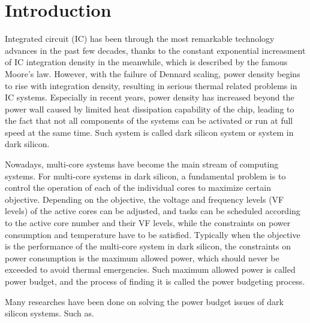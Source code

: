 \section{Introduction}

Integrated circuit (IC) has been through the most remarkable technology advances in the past few decades, thanks to the constant exponential increasment of IC integration density in the meanwhile, which is described by the famous Moore's law. However, with the failure of Dennard scaling, power density begins to rise with integration density, resulting in serious thermal related problems in IC systems. Especially in recent years, power density has increased beyond the power wall caused by limited heat dissipation capability of the chip, leading to the fact that not all components of the systems can be activated or run at full speed at the same time. Such system is called dark silicon system or system in dark silicon.

Nowadays, multi-core systems have become the main stream of computing systems. For multi-core systems in dark silicon, a fundamental problem is to control the operation of each of the individual cores to maximize certain objective. Depending on the objective, the voltage and frequency levels (VF levels) of the active cores can be adjusted, and tasks can be scheduled according to the active core number and their VF levels, while the constraints on power consumption and temperature have to be satisfied. Typically when the objective is the performance of the multi-core system in dark silicon, the constraints on power consumption is the maximum allowed power, which should never be exceeded to avoid thermal emergencies. Such maximum allowed power is called power budget, and the process of finding it is called the power budgeting process. 

Many researches have been done on solving the power budget issues of dark silicon systems. Such as.

